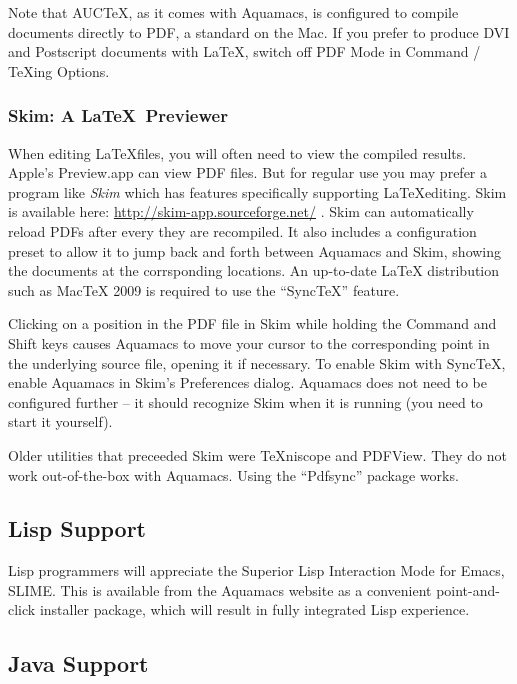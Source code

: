 \documentclass[11pt,letterpaper]{article}
\begin{document}
Note that AUCTeX, as it comes with Aquamacs, is configured to compile documents directly to PDF, a standard on the Mac. If you prefer to produce DVI and Postscript documents with LaTeX, switch off PDF Mode in Command / TeXing Options.



\subsubsection{Skim: A   \LaTeX\ Previewer}

When editing \LaTeX files, you will often need to view the compiled results. Apple's Preview.app can view PDF files. But for regular use you may prefer a program like \emph{Skim} which has features specifically supporting \LaTeX editing.  Skim is available here:  \url{http://skim-app.sourceforge.net/} .  Skim can automatically reload PDFs after every they are recompiled. It also includes a configuration preset to allow it to jump back and forth between Aquamacs and Skim, showing the documents at the corrsponding locations.  An up-to-date LaTeX distribution such as MacTeX 2009 is required to use the ``SyncTeX'' feature.  

Clicking on a position in the PDF file in Skim while holding the Command and Shift keys causes Aquamacs to move your cursor to the corresponding point in the underlying source file, opening it if necessary. To enable Skim with SyncTeX, enable Aquamacs in Skim's Preferences dialog.  Aquamacs does not need to be configured further -- it should recognize Skim when it is running (you need to start it yourself).

Older utilities that preceeded Skim were  \TeX niscope and PDFView.  They do not work out-of-the-box with Aquamacs. Using the ``Pdfsync'' package works.


\subsection{Lisp Support}

Lisp programmers will appreciate the Superior Lisp Interaction Mode for Emacs, SLIME.  This is available from the Aquamacs website as a convenient point-and-click installer package, which will result in fully integrated Lisp experience.


\subsection{Java Support}
\end{document}
